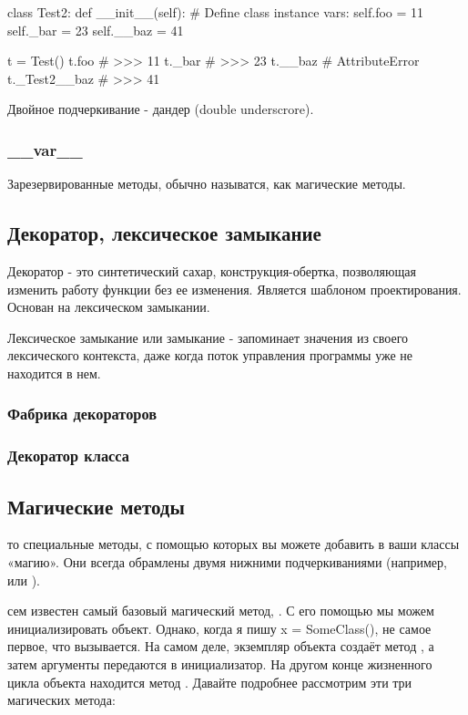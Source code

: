 \begin{python}
class Test2:
    def __init__(self):
        # Define class instance vars:
        self.foo = 11
        self._bar = 23
        self.__baz = 41

t = Test()
t.foo
# >>> 11
t._bar
# >>> 23
t.__baz
# AttributeError
t._Test2__baz
# >>> 41
\end{python}

Двойное подчеркивание - дандер (double underscrore).

\subsubsection{\_\_var\_\_}

Зарезервированные методы, обычно называтся, как магические методы.

\subsection{Декоратор, лексическое замыкание}

Декоратор - это синтетический сахар, конструкция-обертка, позволяющая изменить работу функции без ее изменения. Является шаблоном проектирования. Основан на лексическом замыкании.

Лексическое замыкание или замыкание - запоминает значения из своего лексического контекста, даже когда поток управления программы уже не находится в нем.

\subsubsection{Фабрика декораторов}

\subsubsection{Декоратор класса}

\subsection{Магические методы}

то специальные методы, с помощью которых вы можете добавить в ваши классы «магию». Они всегда обрамлены двумя нижними подчеркиваниями (например,  или ).

сем известен самый базовый магический метод, . С его помощью мы можем инициализировать объект. Однако, когда я пишу x = SomeClass(),  не самое первое, что вызывается. На самом деле, экземпляр объекта создаёт метод , а затем аргументы передаются в инициализатор. На другом конце жизненного цикла объекта находится метод . Давайте подробнее рассмотрим эти три магических метода:

